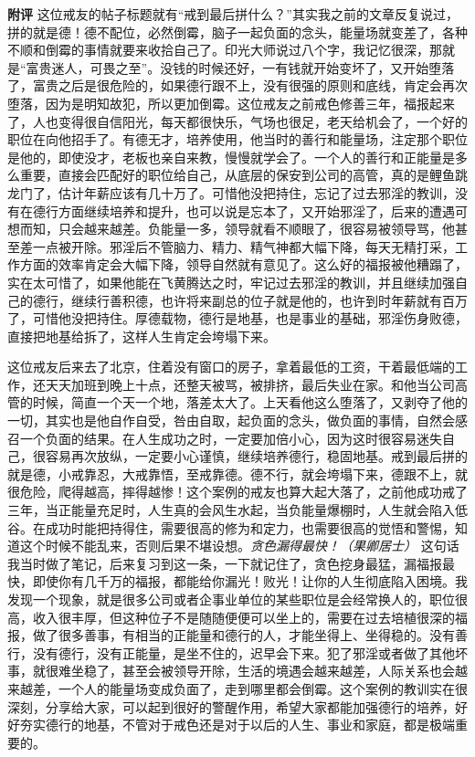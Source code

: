 \begin{case}
    \textbf{附评} 这位戒友的帖子标题就有“戒到最后拼什么？”其实我之前的文章反复说过，拼的就是德！德不配位，必然倒霉，脑子一起负面的念头，能量场就变差了，各种不顺和倒霉的事情就要来收拾自己了。印光大师说过八个字，我记忆很深，那就是“富贵迷人，可畏之至”。没钱的时候还好，一有钱就开始变坏了，又开始堕落了，富贵之后是很危险的，如果德行跟不上，没有很强的原则和底线，肯定会再次堕落，因为是明知故犯，所以更加倒霉。这位戒友之前戒色修善三年，福报起来了，人也变得很自信阳光，每天都很快乐，气场也很足，老天给机会了，一个好的职位在向他招手了。有德无才，培养使用，他当时的善行和能量场，注定那个职位是他的，即使没才，老板也亲自来教，慢慢就学会了。一个人的善行和正能量是多么重要，直接会匹配好的职位给自己，从底层的保安到公司的高管，真的是鲤鱼跳龙门了，估计年薪应该有几十万了。可惜他没把持住，忘记了过去邪淫的教训，没有在德行方面继续培养和提升，也可以说是忘本了，又开始邪淫了，后来的遭遇可想而知，只会越来越差。负能量一多，领导就看不顺眼了，很容易被领导骂，他甚至差一点被开除。邪淫后不管脑力、精力、精气神都大幅下降，每天无精打采，工作方面的效率肯定会大幅下降，领导自然就有意见了。这么好的福报被他糟蹋了，实在太可惜了，如果他能在飞黄腾达之时，牢记过去邪淫的教训，并且继续加强自己的德行，继续行善积德，也许将来副总的位子就是他的，也许到时年薪就有百万了，可惜他没把持住。厚德载物，德行是地基，也是事业的基础，邪淫伤身败德，直接把地基给拆了，这样人生肯定会垮塌下来。

    这位戒友后来去了北京，住着没有窗口的房子，拿着最低的工资，干着最低端的工作，还天天加班到晚上十点，还整天被骂，被排挤，最后失业在家。和他当公司高管的时候，简直一个天一个地，落差太大了。上天看他这么堕落了，又剥夺了他的一切，其实也是他自作自受，咎由自取，起负面的念头，做负面的事情，自然会感召一个负面的结果。在人生成功之时，一定要加倍小心，因为这时很容易迷失自己，很容易再次放纵，一定要小心谨慎，继续培养德行，稳固地基。戒到最后拼的就是德，小戒靠忍，大戒靠悟，至戒靠德。德不行，就会垮塌下来，德跟不上，就很危险，爬得越高，摔得越惨！这个案例的戒友也算大起大落了，之前他成功戒了三年，当正能量充足时，人生真的会风生水起，当负能量爆棚时，人生就会陷入低谷。在成功时能把持得住，需要很高的修为和定力，也需要很高的觉悟和警惕，知道这个时候不能乱来，否则后果不堪设想。\textit{贪色漏得最快！（果卿居士）} 这句话我当时做了笔记，后来复习到这一条，一下就记住了，贪色挖身最猛，漏福报最快，即使你有几千万的福报，都能给你漏光！败光！让你的人生彻底陷入困境。我发现一个现象，就是很多公司或者企事业单位的某些职位是会经常换人的，职位很高，收入很丰厚，但这种位子不是随随便便可以坐上的，需要在过去培植很深的福报，做了很多善事，有相当的正能量和德行的人，才能坐得上、坐得稳的。没有善行，没有德行，没有正能量，是坐不住的，迟早会下来。犯了邪淫或者做了其他坏事，就很难坐稳了，甚至会被领导开除，生活的境遇会越来越差，人际关系也会越来越差，一个人的能量场变成负面了，走到哪里都会倒霉。这个案例的教训实在很深刻，分享给大家，可以起到很好的警醒作用，希望大家都能加强德行的培养，好好夯实德行的地基，不管对于戒色还是对于以后的人生、事业和家庭，都是极端重要的。


\end{case}
